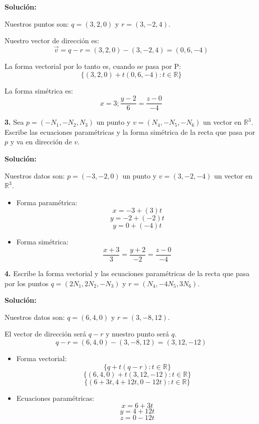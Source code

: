 \documentclass{article}
\begin{document}
\textbf{Solución:}
\vspace{10pt}

Nuestros puntos son: $q = (3, 2,0)$ y $r = (3, -2, 4)$.

Nuestro vector de dirección es:
$$\vec{v} = q - r = (3, 2,0) - (3, -2, 4) = (0, 6, -4)$$

La forma vectorial por lo tanto es, cuando se pasa por P:
$$\{(3,2,0)+t(0,6,-4):t\in \mathbb{R}\}$$

La forma simétrica es:
$$ x = 3; \frac{y-2}{6} = \frac{z-0}{-4}$$

\textbf{3.} Sea $p = (-N_1, -N_2, N_3)$ un punto y $v =(N_4, -N_5,-N_6)$ un vector en $\mathbb{R}^3$. Escribe las ecuaciones 
paramétricas y la forma simétrica de la recta que pasa por $p$ y va en dirección de $v$.
\vspace{10pt}

\textbf{Solución:}
\vspace*{10pt}

Nuestros datos son: $p = (-3, -2, 0)$ un punto y $v =(3, -2,-4)$ un vector en $\mathbb{R}^3$.

\begin{itemize}
    \item Forma paramétrica:
    $$x = -3 +(3)t$$
    $$y = -2 +(-2)t$$
    $$y = 0 +(-4)t$$
    \item Forma simétrica:
    $$\frac{x+3}{3} = \frac{y+2}{-2} = \frac{z -0}{-4}$$ 
    
\end{itemize}
\vspace{10pt}

\textbf{4.} Escribe la forma vectorial y las ecuaciones paramétricas de la recta que pasa por los puntos $q =(2N_1, 2N_2,-N_3)$ y 
$r = (N_4,-4N_5,3N_6 )$.
\vspace*{10pt}

\textbf{Solución: }
\vspace{10pt}

Nuestros datos son: $q =(6, 4,0)$ y $r = (3,-8,12 )$.

El vector de dirección será $q-r$ y nuestro punto será $q$.
$$ q-r =(6,4,0)-(3,-8,12) = (3, 12, -12)$$

\begin{itemize}
    \item Forma vectorial:
    $$\{q+t(q-r): t \in \mathbb{R}\}$$
    $$\{(6,4,0)+t(3,12,-12): t \in \mathbb{R}\}$$
    $$\{(6+3t,4+12t,0-12t): t \in \mathbb{R}\}$$

    \item Ecuaciones paramétricas:
    $$x = 6+3t$$
    $$y = 4+12t$$
    $$z = 0-12t$$
\end{itemize}
\vspace{10pt}
\end{document}
